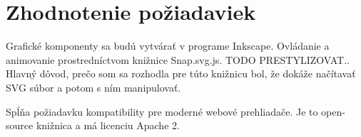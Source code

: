 %

\section{Zhodnotenie požiadaviek}
Grafické komponenty sa budú vytvárať v programe Inkscape. Ovládanie a animovanie prostredníctvom knižnice Snap.svg.js. 
TODO PRESTYLIZOVAT.. 
Hlavný dôvod, prečo som sa rozhodla pre túto  knižnicu bol, že dokáže načítavať SVG súbor a potom s ním manipulovať.
 
Spĺňa požiadavku kompatibility pre moderné webové prehliadače. Je to open-source knižnica a má licenciu Apache 2.  